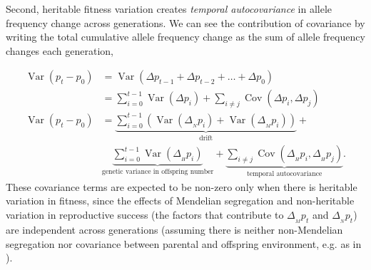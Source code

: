 \documentclass[11pt]{article}
\newcommand{\nnn}{\nonumber}
\DeclareMathOperator{\var}{Var}
\DeclareMathOperator{\cov}{Cov}
\begin{document}
Second, heritable fitness variation creates \emph{temporal autocovariance} in
allele frequency change across generations. We can see the contribution of
covariance by writing the total cumulative allele frequency change as the sum
of allele frequency changes each generation,

\begin{align}
  \label{eq:var-decomp}
  \var(p_t - p_0) &= \var(\Delta p_{t-1} + \Delta p_{t-2} + \ldots + \Delta p_0) \nnn \\
                  &= \sum_{i=0}^{t-1} \var(\Delta p_i) + \sum_{i \ne j} \cov(\Delta p_{i}, \Delta p_{j}) \nnn \\
  \var(p_t - p_0) &= \underbrace{\sum_{i=0}^{t-1} \left(\var(\Delta_{_N} p_i) +  \var(\Delta_{_M} p_i) \right)}_\text{drift} +  \nonumber\\ 
                  &\underbrace{\sum_{i=0}^{t-1} \var(\Delta_{_H} p_i)}_\text{genetic variance in offspring number} + \underbrace{\sum_{i \ne j} \cov(\Delta_{_H} p_i, \Delta_{_H} p_j)}_\text{temporal autocovariance}.
\end{align}
%
These covariance terms are expected to be non-zero only when there is heritable
variation in fitness, since the effects of Mendelian segregation and
non-heritable variation in reproductive success (the factors that contribute to
$\Delta_{_M} p_t$ and $\Delta_{_N} p_t$) are independent across generations
(assuming there is neither non-Mendelian segregation nor covariance between
parental and offspring environment, e.g. as in \cite{Heyer2005-cl}). 

\end{document}
